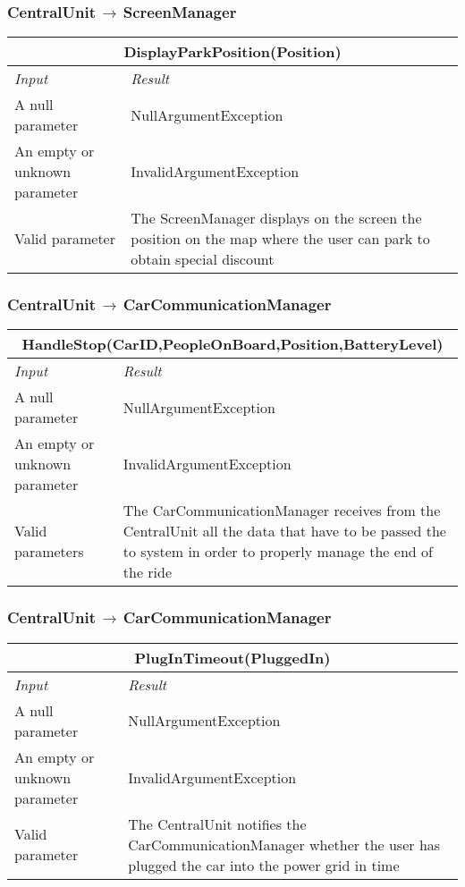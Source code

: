 \documentclass[11pt,a4paper]{report}
\begin{document}
\subsubsection{CentralUnit$\,\to\,$ScreenManager}
\begin{tabularx}{\textwidth}{|X|X|}
	\hline
	\multicolumn{2}{|c|}{\textbf{DisplayParkPosition(Position)}}\\
	\hline
	\textit{Input} & \textit{Result}\\
	\hline
	A null parameter & NullArgumentException\\
	\hline
	An empty or unknown parameter & InvalidArgumentException\\
	\hline
	Valid parameter & The ScreenManager displays on the screen the position on the map where the user can park to obtain special discount\\
	\hline
\end{tabularx}
\subsubsection{CentralUnit$\,\to\,$CarCommunicationManager}
\begin{tabularx}{\textwidth}{|X|X|}
	\hline
	\multicolumn{2}{|c|}{\textbf{HandleStop(CarID,PeopleOnBoard,Position,BatteryLevel)}}\\
	\hline
	\textit{Input} & \textit{Result}\\
	\hline
	A null parameter & NullArgumentException\\
	\hline
	An empty or unknown parameter & InvalidArgumentException\\
	\hline
	Valid parameters & The CarCommunicationManager receives from the CentralUnit all the data that have to be passed the to system in order to properly manage the end of the ride\\
	\hline
\end{tabularx}
\subsubsection{CentralUnit$\,\to\,$CarCommunicationManager}
\begin{tabularx}{\textwidth}{|X|X|}
	\hline
	\multicolumn{2}{|c|}{\textbf{PlugInTimeout(PluggedIn)}}\\
	\hline
	\textit{Input} & \textit{Result}\\
	\hline
	A null parameter & NullArgumentException\\
	\hline
	An empty or unknown parameter & InvalidArgumentException\\
	\hline
	Valid parameter & The CentralUnit notifies the CarCommunicationManager whether the user has plugged the car into the power grid in time\\
	\hline
\end{tabularx}
\end{document}
